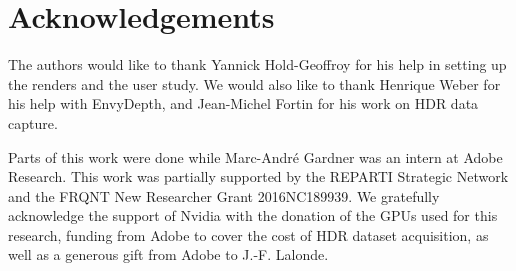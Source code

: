 \documentclass[acmtog]{acmart}
\begin{document}
\maketitle


\vspace{15em}










\section*{Acknowledgements}

The authors would like to thank Yannick Hold-Geoffroy for his help in setting up the renders and the user study. We would also like to thank Henrique Weber for his help with EnvyDepth, and Jean-Michel Fortin for his work on HDR data capture.

Parts of this work were done while Marc-Andr\'e Gardner was an intern at Adobe Research. This work was partially supported by the REPARTI Strategic Network and the FRQNT New Researcher Grant 2016NC189939. We gratefully acknowledge the support of Nvidia with the donation of the GPUs used for this research, funding from Adobe to cover the cost of HDR dataset acquisition, as well as a generous gift from Adobe to J.-F. Lalonde. 



\end{document}
